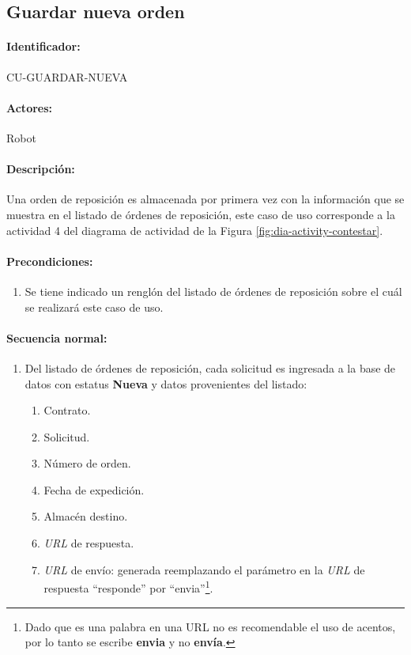 \subsection{Guardar nueva orden}\label{cu-guardar-nueva}
\paragraph{Identificador:}
CU-GUARDAR-NUEVA
\paragraph{Actores:}
Robot
\paragraph{Descripción:}
Una orden de reposición es almacenada por primera vez con la información que se muestra en el listado de órdenes de reposición, este caso de uso corresponde a la actividad 4 del diagrama de actividad de la Figura \ref{fig:dia-activity-contestar}.
\paragraph{Precondiciones:}
\begin{enumerate}
  \item Se tiene indicado un renglón del listado de órdenes de reposición sobre el cuál se realizará este caso de uso.
\end{enumerate}
\paragraph{Secuencia normal:}
\begin{enumerate}
  \item Del listado de órdenes de reposición, cada solicitud es ingresada a la base de datos con estatus \textbf{Nueva} y datos provenientes del listado:
  \begin{enumerate}
    \item Contrato.
    \item Solicitud.
    \item Número de orden.
    \item Fecha de expedición.
    \item Almacén destino.
    \item \textit{URL} de respuesta.
    \item \textit{URL} de envío: generada reemplazando el parámetro en la \textit{URL} de respuesta ``responde'' por ``envia''\footnote{Dado que es una palabra en una URL no es recomendable el uso de acentos, por lo tanto se escribe \textbf{envia} y no \textbf{envía}.}.
  \end{enumerate}
\end{enumerate}
